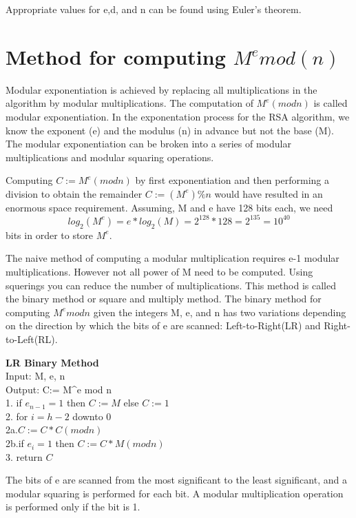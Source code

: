 Appropriate values for e,d, and n can be found using Euler's theorem.


\section{Method for computing $M^emod(n)$}
Modular exponentiation is achieved by replacing all multiplications in the algorithm by modular multiplications.
The computation of $M^e(mod n)$ is called modular exponentiation. In the exponentation process for the RSA algorithm, we know the exponent (e) and the modulus (n) in advance but not the base (M). 
The modular exponentiation can be broken into a series of modular multiplications and modular squaring operations.

Computing $C:= M^e (mod n)$ by first exponentiation and then performing a division to obtain the remainder $C:=(M^e)\%n $ would have resulted in an enormous space requirement. Assuming, M and e have 128 bits each, we need
\begin{equation}
    log_2(M^e)=e*log_2(M) = 2^{128}*128=2^{135} = 10^{40}
\end{equation}
bits in order to store $M^e$.

The naive method of computing a modular multiplication requires e-1 modular multiplications. However not all power of M need to be computed. Using squerings you can reduce the number of multiplications. This method is called the binary method or square and multiply method.
The binary method for computing $M^emodn$ given the integers M, e, and n has two variations depending on the direction by which the bits of e are scanned: Left-to-Right(LR) and Right-to-Left(RL).

\begin{algorithm}
\setAlgoLined
    \textbf{LR Binary Method}\\
    Input: M, e, n\\
    Output: C:= M^e mod n\\
    1. if $e_{n-1}=1$ then $C:=M$ else $C:=1$\\
    2. for $i=h-2$ downto 0\\
    2a.\quad $C:=C * C (mod n)$\\
    2b.\quad if $e_{i}=1$ then $C:=C * M (mod n)$\\
    3. return $C$
\end{algorithm}

The bits of e are scanned from the most significant to the least significant, and a modular squaring is performed for each bit. A modular multiplication operation is performed only if the bit is 1.

